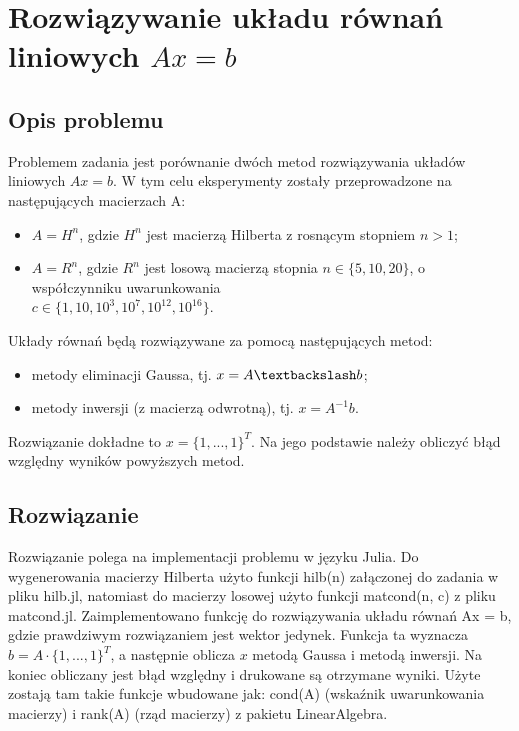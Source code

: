\documentclass{article}
\begin{document}
\section{Rozwiązywanie układu równań liniowych $Ax=b$}

\subsection{Opis problemu}
Problemem zadania jest porównanie dwóch metod rozwiązywania układów liniowych $Ax = b$. W tym celu eksperymenty zostały przeprowadzone na następujących macierzach A:
\begin{itemize}
    \item $A = H^n$, gdzie $H^n$ jest macierzą Hilberta z rosnącym stopniem $n > 1$;
    \item $A = R^n$, gdzie $R^n$ jest losową macierzą stopnia $n \in \{5, 10, 20\}$, o współczynniku uwarunkowania \\$c \in \{1, 10, 10^3, 10^7, 10^{12}, 10^{16}\}$.
\end{itemize}
Układy równań będą rozwiązywane za pomocą następujących metod:
\begin{itemize}
    \item metody eliminacji Gaussa, tj. $x = A\textbackslash
b$;
    \item metody inwersji (z macierzą odwrotną), tj. $x = A^{-1}b$.
\end{itemize}
Rozwiązanie dokładne to $x = \{1, ..., 1\}^T$. Na jego podstawie należy obliczyć błąd względny wyników powyższych metod.
\subsection{Rozwiązanie}
Rozwiązanie polega na implementacji problemu w języku Julia. Do wygenerowania macierzy Hilberta użyto funkcji hilb(n) załączonej do zadania w pliku hilb.jl, natomiast do macierzy losowej użyto funkcji matcond(n, c) z pliku matcond.jl. Zaimplementowano funkcję do rozwiązywania układu równań Ax = b, gdzie prawdziwym rozwiązaniem jest wektor jedynek. Funkcja ta wyznacza $b = A \cdot \{1, ..., 1\}^T$, a następnie oblicza $x$ metodą Gaussa i metodą inwersji. Na koniec obliczany jest błąd względny i drukowane są otrzymane wyniki. Użyte zostają tam takie funkcje wbudowane jak: cond(A) (wskaźnik uwarunkowania macierzy) i rank(A) (rząd macierzy) z pakietu LinearAlgebra.
\end{document}
